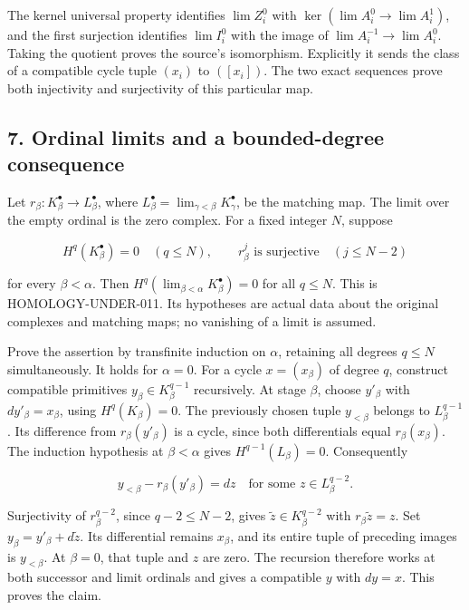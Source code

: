 The kernel universal property identifies \(\lim Z_i^0\) with \(\ker(\lim A_i^0\to\lim A_i^1)\), and the first surjection identifies \(\lim I_i^0\) with the image of \(\lim A_i^{-1}\to\lim A_i^0\). Taking the quotient proves the source's isomorphism. Explicitly it sends the class of a compatible cycle tuple \((x_i)\) to \(([x_i])\). The two exact sequences prove both injectivity and surjectivity of this particular map.

\subsection{7. Ordinal limits and a bounded-degree consequence}\label{note-09-ordinal-limits-and-a-bounded-degree-consequence}

Let \(r_\beta:K_\beta^\bullet\to L_\beta^\bullet\), where \(L_\beta^\bullet=\lim_{\gamma<\beta}K_\gamma^\bullet\), be the matching map. The limit over the empty ordinal is the zero complex. For a fixed integer \(N\), suppose

\[
H^q(K_\beta^\bullet)=0\quad(q\leq N),\qquad
r_\beta^j\text{ is surjective}\quad(j\leq N-2)
\]

for every \(\beta<\alpha\). Then \(H^q(\lim_{\beta<\alpha}K_\beta^\bullet)=0\) for all \(q\leq N\). This is HOMOLOGY-UNDER-011. Its hypotheses are actual data about the original complexes and matching maps; no vanishing of a limit is assumed.

Prove the assertion by transfinite induction on \(\alpha\), retaining all degrees \(q\leq N\) simultaneously. It holds for \(\alpha=0\). For a cycle \(x=(x_\beta)\) of degree \(q\), construct compatible primitives \(y_\beta\in K_\beta^{q-1}\) recursively. At stage \(\beta\), choose \(y'_\beta\) with \(dy'_\beta=x_\beta\), using \(H^q(K_\beta)=0\). The previously chosen tuple \(y_{<\beta}\) belongs to \(L_\beta^{q-1}\). Its difference from \(r_\beta(y'_\beta)\) is a cycle, since both differentials equal \(r_\beta(x_\beta)\). The induction hypothesis at \(\beta<\alpha\) gives \(H^{q-1}(L_\beta)=0\). Consequently

\[
y_{<\beta}-r_\beta(y'_\beta)=dz
\quad\text{for some }z\in L_\beta^{q-2}.
\]

Surjectivity of \(r_\beta^{q-2}\), since \(q-2\leq N-2\), gives \(\widetilde z\in K_\beta^{q-2}\) with \(r_\beta\widetilde z=z\). Set \(y_\beta=y'_\beta+d\widetilde z\). Its differential remains \(x_\beta\), and its entire tuple of preceding images is \(y_{<\beta}\). At \(\beta=0\), that tuple and \(z\) are zero. The recursion therefore works at both successor and limit ordinals and gives a compatible \(y\) with \(dy=x\). This proves the claim.

